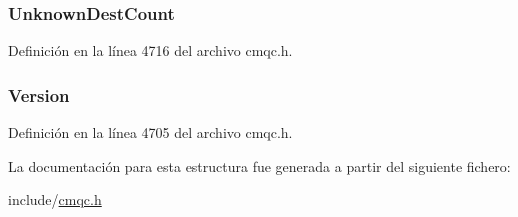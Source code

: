 \subsubsection[{Unknown\+Dest\+Count}]{ Unknown\+Dest\+Count}\label{structtag_m_q_o_d_a6443c93f9930aa26f661e00e631a32ea}


Definición en la línea 4716 del archivo cmqc.\+h.

\hypertarget{structtag_m_q_o_d_a0656ef8f766b3907d394d88a35d7b7e9}{}
\subsubsection[{Version}]{ Version}\label{structtag_m_q_o_d_a0656ef8f766b3907d394d88a35d7b7e9}


Definición en la línea 4705 del archivo cmqc.\+h.



La documentación para esta estructura fue generada a partir del siguiente fichero\+:\begin{DoxyCompactItemize}
\item 
include/\hyperlink{cmqc_8h}{cmqc.\+h}\end{DoxyCompactItemize}
